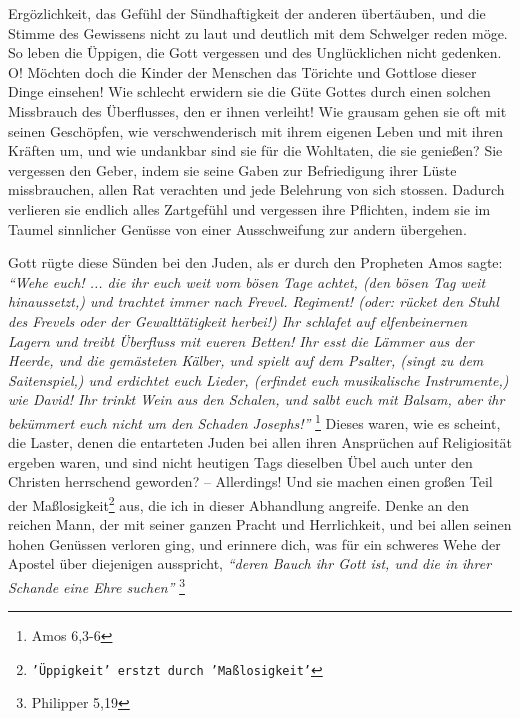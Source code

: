 Ergözlichkeit, das Gefühl der Sündhaftigkeit der anderen 
übertäuben, und die
Stimme des Gewissens nicht zu laut und deutlich mit dem Schwelger 
reden möge. So
leben die Üppigen, die Gott vergessen und des Unglücklichen nicht gedenken. O!
Möchten doch die Kinder der Menschen das Törichte und Gottlose dieser Dinge
einsehen! Wie schlecht erwidern sie die Güte Gottes durch einen solchen
Missbrauch des Überflusses, den er ihnen verleiht! Wie grausam gehen sie oft
mit seinen Geschöpfen, wie verschwenderisch mit ihrem eigenen Leben und mit
ihren Kräften um, und wie undankbar sind sie für die Wohltaten, die sie
genießen? Sie vergessen den Geber, indem sie seine Gaben zur Befriedigung ihrer
Lüste missbrauchen, allen Rat verachten und jede Belehrung von sich stossen.
Dadurch verlieren sie endlich alles Zartgefühl und vergessen ihre Pflichten,
indem sie im Taumel sinnlicher Genüsse von einer Ausschweifung zur andern
übergehen.

\medskip

Gott rügte diese Sünden bei den Juden, als er durch den Propheten Amos sagte:
\textit{"`Wehe euch! ... die ihr euch weit vom bösen Tage achtet, (den bösen Tag weit
hinaussetzt,) und trachtet immer nach Frevel. Regiment! (oder: rücket den Stuhl
des Frevels oder der Gewalttätigkeit herbei!) Ihr schlafet auf elfenbeinernen
Lagern und treibt Überfluss mit eueren Betten! Ihr esst die Lämmer aus der
Heerde, und die gemästeten Kälber, und spielt auf dem Psalter, (singt zu dem
Saitenspiel,) und erdichtet euch Lieder, (erfindet euch musikalische
Instrumente,) wie David! Ihr trinkt Wein aus den Schalen, und salbt euch mit
Balsam, aber ihr bekümmert euch nicht um den Schaden Josephs!"'}
\footnote{Amos 6,3-6}
Dieses waren, wie es scheint, die Laster, denen die entarteten
Juden bei allen ihren Ansprüchen auf Religiosität ergeben waren, 
und sind nicht
heutigen Tags dieselben Übel auch unter den Christen herrschend geworden? --
Allerdings! Und sie machen einen großen Teil der Maßlosigkeit\footnote{\texttt{'Üppigkeit' erstzt 
durch 'Maßlosigkeit'}} aus, die ich in
dieser Abhandlung angreife. Denke an den reichen Mann, der mit seiner ganzen
Pracht und Herrlichkeit, und bei allen seinen hohen Genüssen verloren ging, und
erinnere dich, was für ein schweres Wehe der Apostel über diejenigen ausspricht,
\textit{"`deren Bauch ihr Gott ist, und die in ihrer Schande eine Ehre suchen"'}
\footnote{Philipper 5,19}

